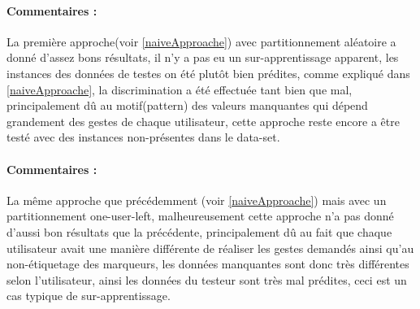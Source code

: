 \paragraph{Commentaires :}\label{zeros}
La première approche(voir \ref{naiveApproache}) avec partitionnement aléatoire a  donné d'assez bons résultats, il n'y a pas eu un sur-apprentissage apparent, les instances des données de testes on été plutôt bien prédites, comme expliqué dans \ref{naiveApproache}, la discrimination a été effectuée tant bien que mal, principalement dû au motif(pattern) des valeurs manquantes qui dépend grandement des gestes de chaque utilisateur, cette approche reste encore a être testé avec des instances non-présentes dans le data-set.
\begin{table}[H]
	\centering
	\label{shit}
	\caption{Meilleures architectures sur les données de teste pour l'approche naïve (\ref{naiveApproache}) avec partitionnement one-user-left(\ref{oneLeftLearning})}
\end{table}

\paragraph{Commentaires :	}\label{shit}
La même approche que précédemment (voir \ref{naiveApproache}) mais avec un partitionnement one-user-left, malheureusement cette approche n'a pas donné d'aussi bon résultats que la précédente, principalement dû au fait que chaque utilisateur avait une manière différente de réaliser les gestes demandés ainsi qu'au non-étiquetage des marqueurs, les données manquantes sont donc très différentes selon l'utilisateur, ainsi les données du testeur sont très mal prédites, ceci est un cas typique de sur-apprentissage.

